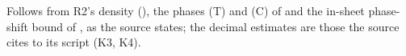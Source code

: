 Follows from R2's density (), the phases (T) and (C) of  and the in-sheet phase-shift bound of , as the source states; the decimal estimates are those the source cites to its script (K3, K4).

